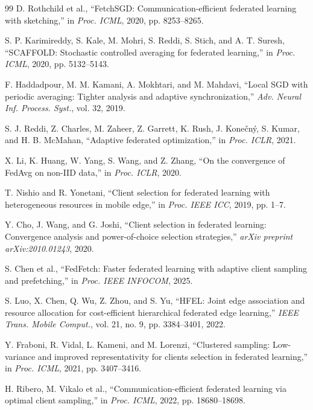 \begin{thebibliography}{99}
D. Rothchild et al., ``FetchSGD: Communication-efficient federated learning with sketching,'' in \textit{Proc. ICML}, 2020, pp. 8253--8265.

S. P. Karimireddy, S. Kale, M. Mohri, S. Reddi, S. Stich, and A. T. Suresh, ``SCAFFOLD: Stochastic controlled averaging for federated learning,'' in \textit{Proc. ICML}, 2020, pp. 5132--5143.

F. Haddadpour, M. M. Kamani, A. Mokhtari, and M. Mahdavi, ``Local SGD with periodic averaging: Tighter analysis and adaptive synchronization,'' \textit{Adv. Neural Inf. Process. Syst.}, vol. 32, 2019.

S. J. Reddi, Z. Charles, M. Zaheer, Z. Garrett, K. Rush, J. Kone\v{c}n\'{y}, S. Kumar, and H. B. McMahan, ``Adaptive federated optimization,'' in \textit{Proc. ICLR}, 2021.

X. Li, K. Huang, W. Yang, S. Wang, and Z. Zhang, ``On the convergence of FedAvg on non-IID data,'' in \textit{Proc. ICLR}, 2020.

T. Nishio and R. Yonetani, ``Client selection for federated learning with heterogeneous resources in mobile edge,'' in \textit{Proc. IEEE ICC}, 2019, pp. 1--7.

Y. Cho, J. Wang, and G. Joshi, ``Client selection in federated learning: Convergence analysis and power-of-choice selection strategies,'' \textit{arXiv preprint arXiv:2010.01243}, 2020.

S. Chen et al., ``FedFetch: Faster federated learning with adaptive client sampling and prefetching,'' in \textit{Proc. IEEE INFOCOM}, 2025.

S. Luo, X. Chen, Q. Wu, Z. Zhou, and S. Yu, ``HFEL: Joint edge association and resource allocation for cost-efficient hierarchical federated edge learning,'' \textit{IEEE Trans. Mobile Comput.}, vol. 21, no. 9, pp. 3384--3401, 2022.

Y. Fraboni, R. Vidal, L. Kameni, and M. Lorenzi, ``Clustered sampling: Low-variance and improved representativity for clients selection in federated learning,'' in \textit{Proc. ICML}, 2021, pp. 3407--3416.

H. Ribero, M. Vikalo et al., ``Communication-efficient federated learning via optimal client sampling,'' in \textit{Proc. ICML}, 2022, pp. 18680--18698.


\end{thebibliography}
